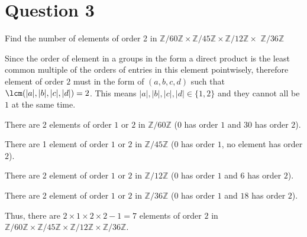 \section{Question 3}

\begin{question}
    Find the number of elements of order 2 in $\mathbb{Z} / 60 \mathbb{Z} \times \mathbb{Z} / 45 \mathbb{Z} \times \mathbb{Z} / 12 \mathbb{Z} \times$ $\mathbb{Z} / 36 \mathbb{Z}$
\end{question}

\begin{answer}
    Since the order of element in a groups in the form a direct product is the least common multiple of the orders of entries in this element pointwisely, therefore element of order $2$ must in the form of $(a,b,c,d)$ such that $\lcm(\lvert a\rvert,\lvert b\rvert,\lvert c\rvert,\lvert d\rvert) = 2$. This means $\lvert a\rvert,\lvert b\rvert,\lvert c\rvert,\lvert d\rvert \in \{1,2\}$ and they cannot all be $1$ at the same time.
    
    There are 2 elements of order $1$ or $2$ in $\mathbb{Z}/60\mathbb{Z}$ ($0$ has order $1$ and $30$ has order $2$).
    
    There are 1 element of order $1$ or $2$ in $\mathbb{Z}/45\mathbb{Z}$ ($0$ has order $1$, no element has order $2$).
    
    There are 2 element of order $1$ or $2$ in $\mathbb{Z}/12\mathbb{Z}$ ($0$ has order $1$ and $6$ has order $2$).
    
    There are 2 element of order $1$ or $2$ in $\mathbb{Z}/36\mathbb{Z}$ ($0$ has order $1$ and $18$ has order $2$).
    
    Thus, there are $2\times 1\times 2\times 2 - 1 = 7$ elements of order $2$ in $\mathbb{Z}/60\mathbb{Z} \times \mathbb{Z}/45\mathbb{Z} \times \mathbb{Z}/12\mathbb{Z} \times \mathbb{Z}/36\mathbb{Z}$.
\end{answer}